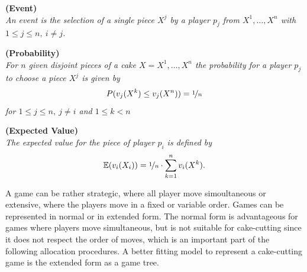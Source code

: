 \begin{defi}{\textbf{(Event)}}\\
\emph{An \emph{event} is the selection of a single piece $X^j$ by a player $p_j$ from $X^1, \ldots, X^n$ with $1 \leq j \leq n,\: i \neq j$.}
\end{defi}
\begin{defi}{\textbf{(Probability)}}\\
\emph{For $n$ given disjoint pieces of a cake $X=X^1, \ldots, X^n$ the \emph{probability} for a player $p_j$ to 
choose a piece $X^j$ is given by $${P}(v_j(X^k) \leq v_j(X^n))=\nicefrac{1}{n}$$ for $1 \leq j \leq n,\: j\neq i$ and $1 \leq k < n$} 
\end{defi}
\begin{defi}{\textbf{(Expected Value)}}\\
\emph{The \emph{expected value} for the piece of player $p_i$ is defined by $$\mathbb{E}(v_i(X_i))= \nicefrac{1}{n} \cdot \sum\limits_{k=1}^n v_i(X^k).$$} 
\end{defi}
A game can be rather strategic, where all player move simoultaneous or extensive, where the players move in a fixed or variable order. Games can be represented in normal or in extended form. The normal form is advantageous for games where players move simultaneous, but is not suitable for cake-cutting since it does not respect the order of moves, which is an important part of the following allocation procedures. A better fitting model to represent a cake-cutting game is the extended form as a game tree.
\newpage
{}
